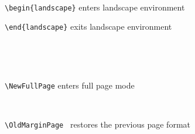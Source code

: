 \documentclass[twoside,8pt]{extarticle}
\begin{document}
~         
         
{\normalsize
\noindent\verb"\begin{landscape}" enters landscape environment}        
 \begin{landscape}
 \lipsum[2-5]
 \end{landscape}
{\normalsize
\noindent\verb"\end{landscape}" exits landscape environment} 

~
 
 \marginpar[{\itshape\tiny\lipsum[1][1-4]}]{\itshape\tiny\lipsum[1][1-3]}  \lipsum[17]   
 
~

{\normalsize
\noindent\verb"\NewFullPage" enters full page mode}
\NewFullPage

         \lipsum[1-4]

~

{\normalsize
\noindent\verb"\OldMarginPage " restores the previous page format}
\OldMarginPage

 \marginpar[{\itshape\tiny\lipsum[1][1-4]}]{\itshape\tiny\lipsum[1][1-3]}  \lipsum[17]   
 
 
     
\end{document}

